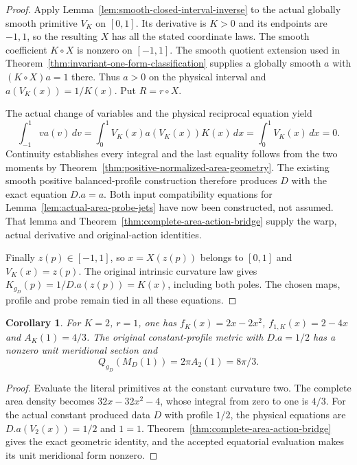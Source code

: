 \documentclass[11pt]{article}
\newtheorem{corollary}[theorem]{Corollary}
\begin{document}
\begin{proof}
Apply Lemma~\ref{lem:smooth-closed-interval-inverse} to the actual globally
smooth primitive $V_K$ on $[0,1]$. Its derivative is $K>0$ and its endpoints
are $-1,1$, so the resulting $X$ has all the stated coordinate laws.
The smooth coefficient $K\circ X$ is nonzero on $[-1,1]$.
The smooth quotient extension used in
Theorem~\ref{thm:invariant-one-form-classification} supplies a globally
smooth $a$ with $(K\circ X)a=1$ there. Thus $a>0$ on the physical interval
and $a(V_K(x))=1/K(x)$. Put $R=r\circ X$.

The actual change of variables and the physical reciprocal equation yield
\[
 \int_{-1}^1v a(v)\,dv
 =\int_0^1 V_K(x)a(V_K(x))K(x)\,dx
 =\int_0^1 V_K(x)\,dx=0 .
\]
Continuity establishes every integral and the last equality follows from
the two moments by Theorem~\ref{thm:positive-normalized-area-geometry}.
The existing smooth positive balanced-profile construction therefore produces
$D$ with the exact equation $D.a=a$.
Both input compatibility equations for
Lemma~\ref{lem:actual-area-probe-jets} have now been constructed, not assumed.
That lemma and Theorem~\ref{thm:complete-area-action-bridge} supply the warp,
actual derivative and original-action identities.

Finally $z(p)\in[-1,1]$, so $x=X(z(p))$ belongs to $[0,1]$ and
$V_K(x)=z(p)$. The original intrinsic curvature law gives
$K_{g_D}(p)=1/D.a(z(p))=K(x)$, including both poles.
The chosen maps, profile and probe remain tied in all these equations.
\end{proof}

\begin{corollary}\label{cor:area-round-normalization}
For $K=2$, $r=1$, one has
$f_K(x)=2x-2x^2$, $f_{1,K}(x)=2-4x$ and $A_K(1)=4/3$.
The original constant-profile metric with $D.a=1/2$ has a nonzero
unit meridional section and
\[
 Q_{g_D}(M_D(1))=2\pi A_2(1)=8\pi/3.
\]
\end{corollary}

\begin{proof}
Evaluate the literal primitives at the constant curvature two.
The complete area density becomes $32x-32x^2-4$, whose integral from zero
to one is $4/3$. For the actual constant produced data $D$ with profile
$1/2$, the physical equations are $D.a(V_2(x))=1/2$ and $1=1$.
Theorem~\ref{thm:complete-area-action-bridge} gives the exact geometric
identity, and the accepted equatorial evaluation makes its unit meridional
form nonzero.
\end{proof}
\end{document}
